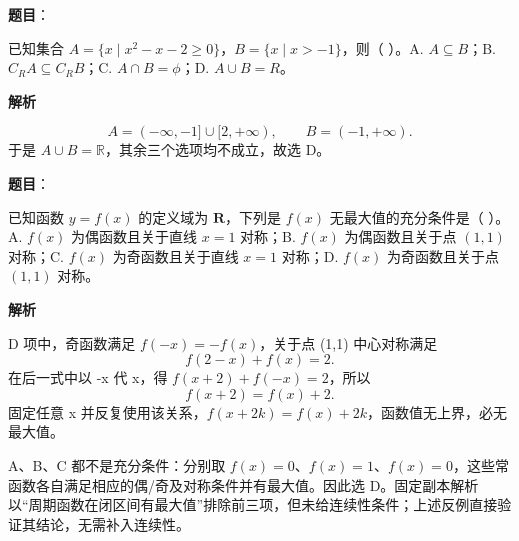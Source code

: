 \begin{answer}

\textbf{题目}：

已知集合 $A=\{x\mid x^2-x-2\ge0\}$，$B=\{x\mid x>-1\}$，则（ ）。A. $A\subseteq B$；B. $C_R A\subseteq C_R B$；C. $A\cap B=\phi$；D. $A\cup B=R$。

\textbf{解析}

\nopagebreak[4]
\[
A=(-\infty,-1]\cup[2,+\infty),\qquad B=(-1,+\infty).
\]
于是 \(A\cup B=\mathbb R\)，其余三个选项均不成立，故选 D。


\end{answer}
\begin{answer}

\textbf{题目}：

已知函数 $y=f(x)$ 的定义域为 $\mathbf R$，下列是 $f(x)$ 无最大值的充分条件是（ ）。A. $f(x)$ 为偶函数且关于直线 $x=1$ 对称；B. $f(x)$ 为偶函数且关于点 $(1,1)$ 对称；C. $f(x)$ 为奇函数且关于直线 $x=1$ 对称；D. $f(x)$ 为奇函数且关于点 $(1,1)$ 对称。

\textbf{解析}

D 项中，奇函数满足 \(f(-x)=-f(x)\)，关于点 (1,1) 中心对称满足
\nopagebreak[4]
\[
f(2-x)+f(x)=2.
\]
在后一式中以 -x 代 x，得 \(f(x+2)+f(-x)=2\)，所以
\nopagebreak[4]
\[
f(x+2)=f(x)+2.
\]
固定任意 x 并反复使用该关系，\(f(x+2k)=f(x)+2k\)，函数值无上界，必无最大值。

A、B、C 都不是充分条件：分别取 \(f(x)=0\)、\(f(x)=1\)、\(f(x)=0\)，这些常函数各自满足相应的偶/奇及对称条件并有最大值。因此选 D。固定副本解析以“周期函数在闭区间有最大值”排除前三项，但未给连续性条件；上述反例直接验证其结论，无需补入连续性。


\end{answer}
